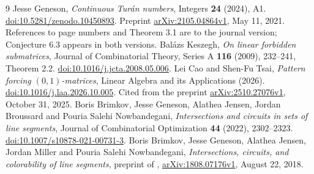 \documentclass[11pt]{article}
\begin{document}
\begin{thebibliography}{9}
Jesse Geneson, \emph{Continuous Tur\'an numbers}, Integers \textbf{24} (2024), A1.
\href{https://doi.org/10.5281/zenodo.10450893}{doi:10.5281/zenodo.10450893}.
Preprint \href{https://arxiv.org/abs/2105.04864v1}{arXiv:2105.04864v1}, May 11, 2021.
References to page numbers and Theorem 3.1 are to the journal version; Conjecture 6.3 appears in both versions.
Bal\'azs Keszegh, \emph{On linear forbidden submatrices}, Journal of Combinatorial Theory, Series A \textbf{116} (2009), 232--241, Theorem 2.2.
\href{https://doi.org/10.1016/j.jcta.2008.05.006}{doi:10.1016/j.jcta.2008.05.006}.
Lei Cao and Shen-Fu Tsai, \emph{Pattern forcing $(0,1)$-matrices}, Linear Algebra and its Applications (2026).
\href{https://doi.org/10.1016/j.laa.2026.10.005}{doi:10.1016/j.laa.2026.10.005}.
Cited from the preprint \href{https://arxiv.org/abs/2510.27076v1}{arXiv:2510.27076v1}, October 31, 2025.
Boris Brimkov, Jesse Geneson, Alathea Jensen, Jordan Broussard and Pouria Salehi Nowbandegani, \emph{Intersections and circuits in sets of line segments}, Journal of Combinatorial Optimization \textbf{44} (2022), 2302--2323.
\href{https://doi.org/10.1007/s10878-021-00731-3}{doi:10.1007/s10878-021-00731-3}.
Boris Brimkov, Jesse Geneson, Alathea Jensen, Jordan Miller and Pouria Salehi Nowbandegani, \emph{Intersections, circuits, and colorability of line segments}, preprint of \cite{Brimkov}, \href{https://arxiv.org/abs/1808.07176v1}{arXiv:1808.07176v1}, August 22, 2018.
\end{thebibliography}
\end{document}
